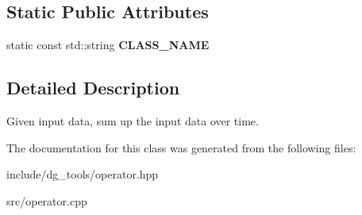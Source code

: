 \subsection*{Static Public Attributes}
\begin{DoxyCompactItemize}
\item 
static const std\+::string {\bfseries C\+L\+A\+S\+S\+\_\+\+N\+A\+ME}\hypertarget{classdg__tools_1_1VectorIntegrator_ae540c92d86c7203c41480e680fbcd7ae}{}\label{classdg__tools_1_1VectorIntegrator_ae540c92d86c7203c41480e680fbcd7ae}

\end{DoxyCompactItemize}


\subsection{Detailed Description}
Given input data, sum up the input data over time. 

The documentation for this class was generated from the following files\+:\begin{DoxyCompactItemize}
\item 
include/dg\+\_\+tools/operator.\+hpp\item 
src/operator.\+cpp\end{DoxyCompactItemize}
